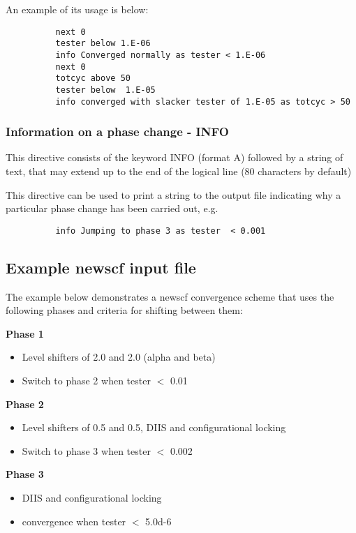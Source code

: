 \documentclass[11pt,fleqn]{article}
\begin{document}
An example of its usage is below:

{
\footnotesize
\begin{verbatim}
          next 0 
          tester below 1.E-06
          info Converged normally as tester < 1.E-06
          next 0
          totcyc above 50
          tester below  1.E-05
          info converged with slacker tester of 1.E-05 as totcyc > 50
\end{verbatim}
}


\subsubsection[Information on a phase change - INFO]{Information on a phase change - INFO}
This directive consists of the keyword INFO (format A) followed
by a string of text, that may extend up to the end of the logical line
(80 characters by default)

This directive can be used to print a string to the output file
indicating why a particular phase change has been carried out, e.g.

{
\footnotesize
\begin{verbatim}
          info Jumping to phase 3 as tester  < 0.001
\end{verbatim}
}

\subsection[Example newscf input file]{Example newscf input file}
The example below demonstrates a newscf convergence scheme that uses
the following phases and criteria for shifting between them:

\textbf{Phase 1}
\begin{itemize}
\item Level shifters of 2.0 and 2.0 (alpha and beta)
\item Switch to phase 2 when tester $<$ 0.01
\end{itemize}

\textbf{Phase 2}
\begin{itemize}
\item Level shifters of 0.5 and 0.5, DIIS and configurational locking
\item Switch to phase 3 when tester $<$ 0.002
\end{itemize}

\textbf{Phase 3}
\begin{itemize}
\item DIIS and configurational locking
\item convergence when tester $<$ 5.0d-6
\end{itemize}
\end{document}
